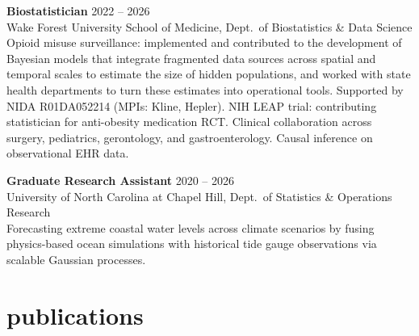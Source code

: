\documentclass[11pt, letterpaper]{article}
\begin{document}
\vspace{3pt}

\textbf{Biostatistician} \hfill 2022 -- 2026 \\
{\color{subtle}Wake Forest University School of Medicine, Dept.\ of Biostatistics \& Data Science} \\
{\small Opioid misuse surveillance: implemented and contributed to the development of Bayesian models that integrate fragmented data sources across spatial and temporal scales to estimate the size of hidden populations, and worked with state health departments to turn these estimates into operational tools. Supported by NIDA R01DA052214 (MPIs: Kline, Hepler). NIH LEAP trial: contributing statistician for anti-obesity medication RCT. Clinical collaboration across surgery, pediatrics, gerontology, and gastroenterology. Causal inference on observational EHR data.}

\vspace{3pt}

\textbf{Graduate Research Assistant} \hfill 2020 -- 2026 \\
{\color{subtle}University of North Carolina at Chapel Hill, Dept.\ of Statistics \& Operations Research} \\
{\small Forecasting extreme coastal water levels across climate scenarios by fusing physics-based ocean simulations with historical tide gauge observations via scalable Gaussian processes.}

\section{publications}
\end{document}

